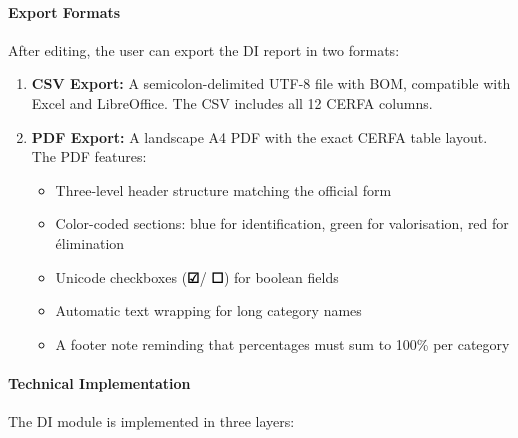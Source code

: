 \documentclass[11pt,a4paper]{article}
\newcommand{\checksymbol}{\textcolor{black}{\textbf{☑}}}
\newcommand{\unchecksymbol}{\textcolor{black}{\textbf{☐}}}
\begin{document}
\paragraph{Export Formats}

After editing, the user can export the DI report in two formats:

\begin{enumerate}[leftmargin=*]
    \item \textbf{CSV Export:} A semicolon-delimited UTF-8 file with BOM, compatible with Excel and LibreOffice. The CSV includes all 12 CERFA columns.
    
    \item \textbf{PDF Export:} A landscape A4 PDF with the exact CERFA table layout. The PDF features:
    \begin{itemize}
        \item Three-level header structure matching the official form
        \item Color-coded sections: blue for identification, green for valorisation, red for \'{e}limination
        \item Unicode checkboxes (\checksymbol / \unchecksymbol) for boolean fields
        \item Automatic text wrapping for long category names
        \item A footer note reminding that percentages must sum to 100\% per category
    \end{itemize}
\end{enumerate}

\paragraph{Technical Implementation}

The DI module is implemented in three layers:
\end{document}
